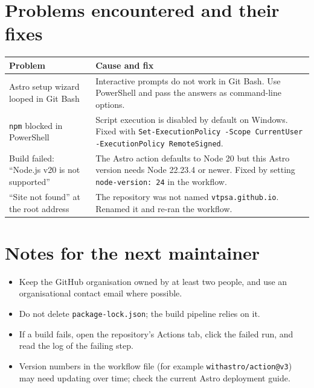 \documentclass[11pt,a4paper]{article}
\begin{document}
\section{Problems encountered and their fixes}
\begin{center}
\small
\begin{tabular}{@{}p{}p{}@{}}
\toprule
\textbf{Problem} & \textbf{Cause and fix} \\
\midrule
Astro setup wizard looped in Git Bash &
Interactive prompts do not work in Git Bash. Use PowerShell and pass the
answers as command-line options. \\
\addlinespace
\texttt{npm} blocked in PowerShell &
Script execution is disabled by default on Windows. Fixed with
\texttt{Set-ExecutionPolicy -Scope CurrentUser -ExecutionPolicy RemoteSigned}. \\
\addlinespace
Build failed: ``Node.js v20 is not supported'' &
The Astro action defaults to Node 20 but this Astro version needs Node 22.23.4
or newer. Fixed by setting \texttt{node-version: 24} in the workflow. \\
\addlinespace
``Site not found'' at the root address &
The repository was not named \texttt{vtpsa.github.io}. Renamed it and re-ran
the workflow. \\
\bottomrule
\end{tabular}
\end{center}

\section{Notes for the next maintainer}
\begin{itemize}[nosep]
  \item Keep the GitHub organisation owned by at least two people, and use an
        organisational contact email where possible.
  \item Do not delete \texttt{package-lock.json}; the build pipeline relies on it.
  \item If a build fails, open the repository's Actions tab, click the failed
        run, and read the log of the failing step.
  \item Version numbers in the workflow file (for example
        \texttt{withastro/action@v3}) may need updating over time; check the
        current Astro deployment guide.
\end{itemize}
\end{document}
